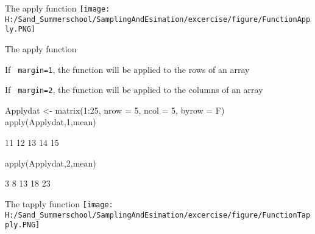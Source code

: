 \documentclass[11pt,german,hideothersubsections]{beamer}
\newcommand{\R}[1]{{\tt \color{blue}  #1}}
\begin{document}
\begin{frame}[fragile]{The apply function}
\texttt{[image: H:/Sand\_Summerschool/SamplingAndEsimation/excercise/figure/FunctionApply.PNG]}
\end{frame}
\begin{frame}[fragile]{The apply function}
\footnotesize{
\begin{itemize}\footnotesize{
\item If \R{margin=1}, the function will be applied to the rows of an array
\item If \R{margin=2}, the function will be applied to the columns of an array
}
\end{itemize}
\vspace{.5cm}
\pause
\begin{Schunk}
\begin{Sinput}
 Applydat <- matrix(1:25, nrow = 5, ncol = 5, byrow = F)
 apply(Applydat,1,mean)
\end{Sinput}
\begin{Soutput}
[1] 11 12 13 14 15
\end{Soutput}
\begin{Sinput}
 apply(Applydat,2,mean)
\end{Sinput}
\begin{Soutput}
[1]  3  8 13 18 23
\end{Soutput}
\end{Schunk}
}
\end{frame}
\begin{frame}[fragile]{The tapply function}
\texttt{[image: H:/Sand\_Summerschool/SamplingAndEsimation/excercise/figure/FunctionTapply.PNG]}
\end{frame}
\end{document}
